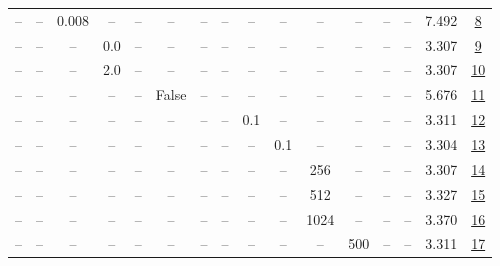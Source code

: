 \begin{table}[H]
\begin{tabular}{cccccccccccccccc}
-- & -- & 0.008 & -- & -- & -- & -- & -- & -- & -- & -- & -- & -- & -- & 7.492 & \href{https://wandb.ai/marin-community/optimizer-scaling/runs/sweep-130m-10B-kroncb2f29lr0.008-wd0.5-b10.95-plr0.2-pis1-gn1-no-63a8f8}{8} \\
-- & -- & -- & 0.0 & -- & -- & -- & -- & -- & -- & -- & -- & -- & -- & 3.307 & \href{https://wandb.ai/marin-community/optimizer-scaling/runs/sweep-130m-10B-krondec291lr0.002-wd0.5-b10.95-plr0.2-pis1-gn0.0--dc5daf}{9} \\
-- & -- & -- & 2.0 & -- & -- & -- & -- & -- & -- & -- & -- & -- & -- & 3.307 & \href{https://wandb.ai/marin-community/optimizer-scaling/runs/sweep-130m-10B-kron848725lr0.002-wd0.5-b10.95-plr0.2-pis1-gn2.0--bf43fe}{10} \\
-- & -- & -- & -- & -- & False & -- & -- & -- & -- & -- & -- & -- & -- & 5.676 & \href{https://wandb.ai/marin-community/optimizer-scaling/runs/sweep-130m-10B-kron1d44fclr0.002-wd0.5-b10.95-plr0.2-pis1-gn1-no-70d4aa}{11} \\
-- & -- & -- & -- & -- & -- & -- & -- & 0.1 & -- & -- & -- & -- & -- & 3.311 & \href{https://wandb.ai/marin-community/optimizer-scaling/runs/sweep-130m-10B-kronb95d56lr0.002-wd0.5-b10.95-plr0.1-pis1-gn1-no-75ac83}{12} \\
-- & -- & -- & -- & -- & -- & -- & -- & -- & 0.1 & -- & -- & -- & -- & 3.304 & \href{https://wandb.ai/marin-community/optimizer-scaling/runs/sweep-130m-10B-kron5b495flr0.002-wd0.5-b10.95-plr0.2-pis1-gn1-no-989d60}{13} \\
-- & -- & -- & -- & -- & -- & -- & -- & -- & -- & 256 & -- & -- & -- & 3.307 & \href{https://wandb.ai/marin-community/optimizer-scaling/runs/sweep-130m-10B-kron45d4b7lr0.002-wd0.5-b10.95-plr0.2-pis1-gn1-no-cdf266}{14} \\
-- & -- & -- & -- & -- & -- & -- & -- & -- & -- & 512 & -- & -- & -- & 3.327 & \href{https://wandb.ai/marin-community/optimizer-scaling/runs/sweep-130m-10B-kronf8119alr0.002-wd0.5-b10.95-plr0.2-pis1-gn1-no-e1c458}{15} \\
-- & -- & -- & -- & -- & -- & -- & -- & -- & -- & 1024 & -- & -- & -- & 3.370 & \href{https://wandb.ai/marin-community/optimizer-scaling/runs/sweep-130m-10B-kron80879elr0.002-wd0.5-b10.95-plr0.2-pis1-gn1-no-214b96}{16} \\
-- & -- & -- & -- & -- & -- & -- & -- & -- & -- & -- & 500 & -- & -- & 3.311 & \href{https://wandb.ai/marin-community/optimizer-scaling/runs/sweep-130m-10B-kron9eb75blr0.002-wd0.5-b10.95-plr0.2-pis1-gn1-no-294485}{17} \\

\end{tabular}
\end{table}
